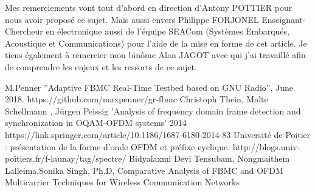 \documentclass[conference]{IEEEtran}
\begin{document}
Mes remerciements vont tout d'abord en direction d'Antony POTTIER pour nous avoir proposé ce sujet. Mais aussi envers Philippe FORJONEL
Enseignant-Chercheur en électronique
aussi de l'équipe SEACom (Systèmes Embarqués, Acoustique et Communications) pour l'aide de la mise en forme de cet article. Je tiens également à remercier mon binôme Alan JAGOT avec qui j'ai travaillé afin de comprendre les enjeux et les ressorts de ce sujet.
%
%

\begin{thebibliography}{00}
 M.Penner ''Adaptive FBMC Real-Time Testbed based on GNU Radio'', June 2018. https://github.com/maxpenner/gr-fbmc
 Christoph Thein, Malte Schellmann , Jürgen Peissig 'Analysis of frequency domain frame detection and synchronization in OQAM-OFDM systems' 2014 https://link.springer.com/article/10.1186/1687-6180-2014-83
 Université de Poitier : présentation de la forme d'onde OFDM et préfixe cyclique. http://blogs.univ-poitiers.fr/f-launay/tag/spectre/
 Bidyalaxmi Devi Tensubam, Nongmaithem Lalleima,Sonika Singh, Ph.D, 
Comparative Analysis of FBMC and OFDM Multicarrier
Techniques for Wireless Communication Networks 
\end{thebibliography}
\vspace{12pt}
\end{document}
